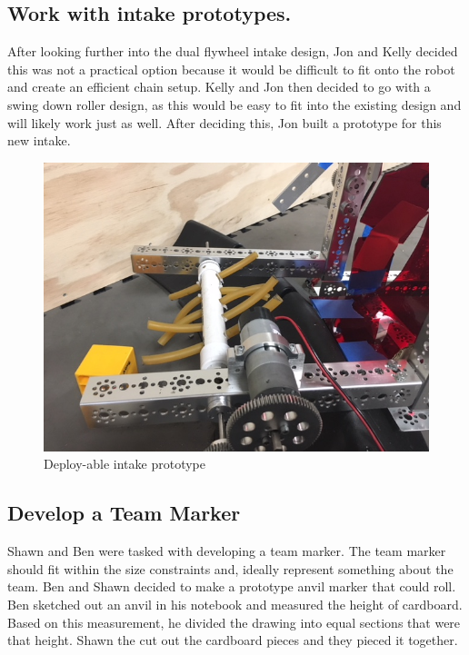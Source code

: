 \documentclass{article}
\newif\ifcontents
\begin{document}
\contentsfalse

\subsection{Work with intake prototypes.}
After looking further into the dual flywheel intake design, Jon and Kelly decided this was not a practical option because it would be difficult to fit onto the robot and create an efficient chain setup. Kelly and Jon then decided to go with a swing down roller design, as this would be easy to fit into the existing design and will likely work just as well. After deciding this, Jon built a prototype for this new intake. 

\begin{figure}
    \centering
    \includegraphics[width=.6\textwidth]{03_09-17/images/IMG_0262.JPG}
    \caption{Deploy-able intake prototype}
    \label{fig:my_label}
\end{figure}

\subsection{Develop a Team Marker}
Shawn and Ben were tasked with developing a team marker. The team marker should fit within the size constraints and, ideally represent something about the team. Ben and Shawn decided to make a prototype anvil marker that could roll. Ben sketched out an anvil in his notebook and measured the height of cardboard. Based on this measurement, he divided the drawing into equal sections that were that height. Shawn the cut out the cardboard pieces and they pieced it together.
\end{document}
